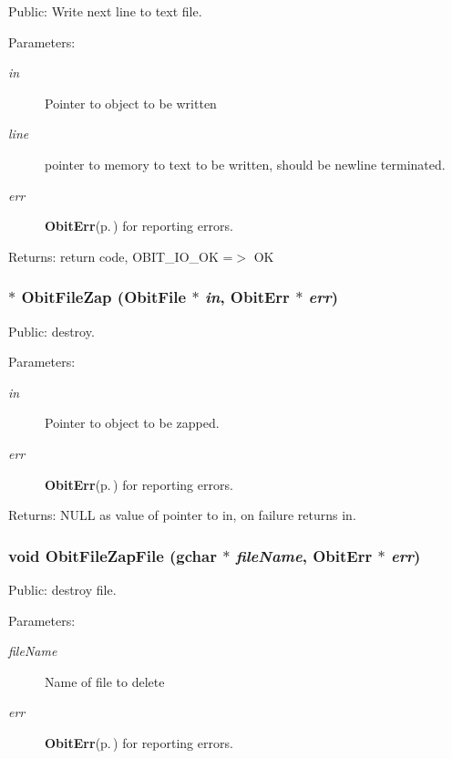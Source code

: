 Public: Write next line to text file. 

\begin{Desc}
\item[Parameters:]
\begin{description}
\item[{\em in}]Pointer to object to be written \item[{\em line}]pointer to memory to text to be written, should be newline terminated. \item[{\em err}]{\bf Obit\-Err}{\rm (p.\,\pageref{structObitErr})} for reporting errors. \end{description}
\end{Desc}
\begin{Desc}
\item[Returns:]return code, OBIT\_\-IO\_\-OK =$>$ OK \end{Desc}
\subsubsection{$\ast$ Obit\-File\-Zap ({\bf Obit\-File} $\ast$ {\em in}, {\bf Obit\-Err} $\ast$ {\em err})}\label{ObitFile_8c_a8}


Public: destroy. 

\begin{Desc}
\item[Parameters:]
\begin{description}
\item[{\em in}]Pointer to object to be zapped. \item[{\em err}]{\bf Obit\-Err}{\rm (p.\,\pageref{structObitErr})} for reporting errors. \end{description}
\end{Desc}
\begin{Desc}
\item[Returns:]NULL as value of pointer to in, on failure returns in. \end{Desc}
\subsubsection{\setlength{\rightskip}{0pt plus 5cm}void Obit\-File\-Zap\-File (gchar $\ast$ {\em file\-Name}, {\bf Obit\-Err} $\ast$ {\em err})}\label{ObitFile_8c_a9}


Public: destroy file. 

\begin{Desc}
\item[Parameters:]
\begin{description}
\item[{\em file\-Name}]Name of file to delete \item[{\em err}]{\bf Obit\-Err}{\rm (p.\,\pageref{structObitErr})} for reporting errors. \end{description}
\end{Desc}
